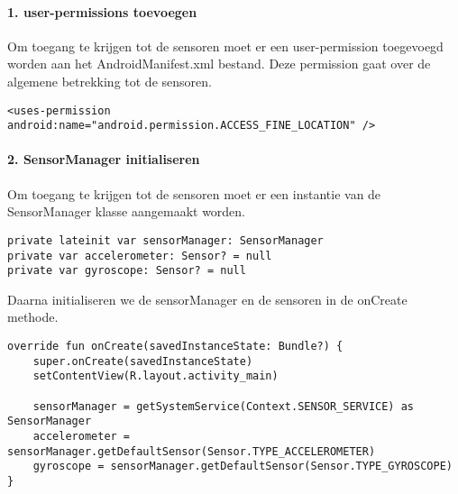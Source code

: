\paragraph{1. user-permissions toevoegen}
Om toegang te krijgen tot de sensoren moet er een user-permission toegevoegd worden aan het 
AndroidManifest.xml bestand. Deze permission gaat over de algemene betrekking tot de sensoren.
\begin{verbatim}
<uses-permission android:name="android.permission.ACCESS_FINE_LOCATION" />
\end{verbatim}

\paragraph{2. SensorManager initialiseren}
Om toegang te krijgen tot de sensoren moet er een instantie van de SensorManager klasse aangemaakt worden.
\begin{verbatim}
private lateinit var sensorManager: SensorManager
private var accelerometer: Sensor? = null
private var gyroscope: Sensor? = null
\end{verbatim}
Daarna initialiseren we de sensorManager en de sensoren in de onCreate methode.
\begin{verbatim}
override fun onCreate(savedInstanceState: Bundle?) {
    super.onCreate(savedInstanceState)
    setContentView(R.layout.activity_main)

    sensorManager = getSystemService(Context.SENSOR_SERVICE) as SensorManager
    accelerometer = sensorManager.getDefaultSensor(Sensor.TYPE_ACCELEROMETER)
    gyroscope = sensorManager.getDefaultSensor(Sensor.TYPE_GYROSCOPE)
}
\end{verbatim}

